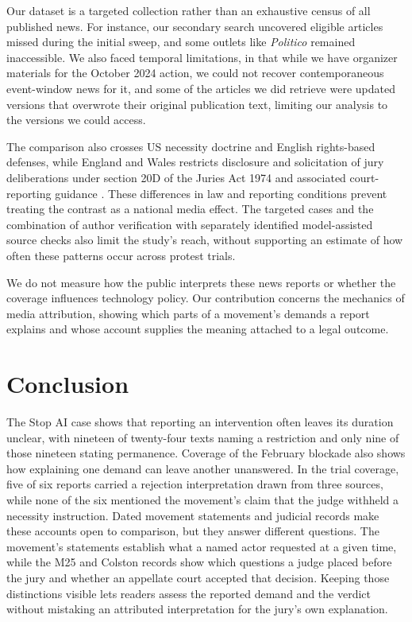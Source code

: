 \documentclass[11pt]{article}
\begin{document}
Our dataset is a targeted collection rather than an exhaustive census of all published news. For instance, our secondary search uncovered eligible articles missed during the initial sweep, and some outlets like \textit{Politico} remained inaccessible. We also faced temporal limitations, in that while we have organizer materials for the October 2024 action, we could not recover contemporaneous event-window news for it, and some of the articles we did retrieve were updated versions that overwrote their original publication text, limiting our analysis to the versions we could access.

The comparison also crosses US necessity doctrine and English rights-based defenses, while England and Wales restricts disclosure and solicitation of jury deliberations under section 20D of the Juries Act 1974 and associated court-reporting guidance \citep{juriesact,reportguide}. These differences in law and reporting conditions prevent treating the contrast as a national media effect. The targeted cases and the combination of author verification with separately identified model-assisted source checks also limit the study's reach, without supporting an estimate of how often these patterns occur across protest trials.

We do not measure how the public interprets these news reports or whether the coverage influences technology policy. Our contribution concerns the mechanics of media attribution, showing which parts of a movement's demands a report explains and whose account supplies the meaning attached to a legal outcome.

\section{Conclusion}
The Stop AI case shows that reporting an intervention often leaves its duration unclear, with nineteen of twenty-four texts naming a restriction and only nine of those nineteen stating permanence. Coverage of the February blockade also shows how explaining one demand can leave another unanswered. In the trial coverage, five of six reports carried a rejection interpretation drawn from three sources, while none of the six mentioned the movement's claim that the judge withheld a necessity instruction. Dated movement statements and judicial records make these accounts open to comparison, but they answer different questions. The movement's statements establish what a named actor requested at a given time, while the M25 and Colston records show which questions a judge placed before the jury and whether an appellate court accepted that decision. Keeping those distinctions visible lets readers assess the reported demand and the verdict without mistaking an attributed interpretation for the jury's own explanation.
\end{document}
